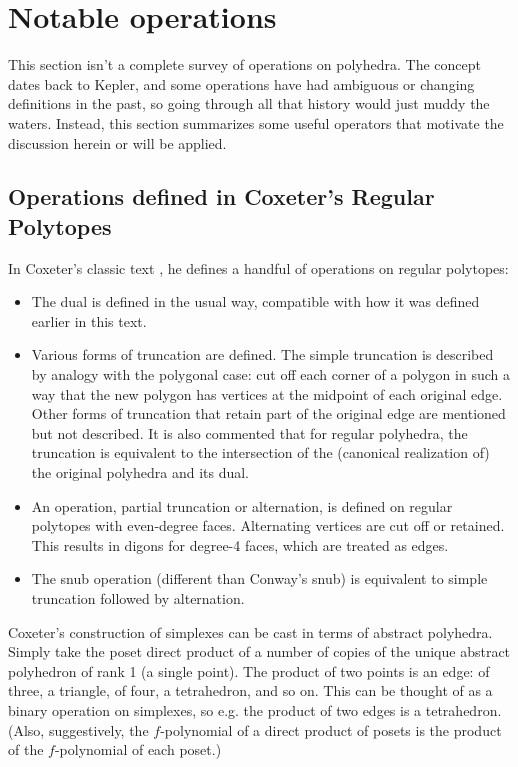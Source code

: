 \documentclass{amsart}[12pt]
\begin{document}
\section{Notable operations}

This section isn't a complete survey of operations on polyhedra. The concept
dates back to Kepler, and some operations have had ambiguous or changing
definitions in the past, so going through all that history would just muddy the
waters. Instead, this section summarizes some useful operators that motivate
the discussion herein or will be applied.

\subsection{Operations defined in Coxeter's Regular Polytopes}

In Coxeter's classic text \cite{Coxeter8},
he defines a handful of operations on regular polytopes:
\begin{itemize}
  \item The dual is defined in the usual way, compatible with how it was
  defined earlier in this text.
  \item Various forms of truncation are defined. The simple truncation is
  described by analogy with the polygonal case: cut off each corner of a
  polygon in such a way that the new polygon has vertices at the midpoint of
  each original edge. Other forms of truncation that retain part of the original
  edge are mentioned but not described. It is also commented that for regular
  polyhedra, the truncation is equivalent to the intersection
  of the (canonical realization of) the original polyhedra and its dual.
  \item An operation, partial truncation or alternation, is defined on regular
  polytopes with even-degree faces. Alternating vertices are cut off or
  retained. This results in digons for degree-4 faces,
  which are treated as edges.
  \item The snub operation (different than Conway's snub)
  is equivalent to simple truncation followed by alternation.
\end{itemize}

Coxeter's construction of simplexes can be cast in terms of abstract polyhedra.
Simply take the poset direct product of a number of copies of the unique
abstract polyhedron of rank 1 (a single point). The product of two points is an
edge: of three, a triangle, of four, a tetrahedron, and so on. This can be
thought of as a binary operation on simplexes, so e.g. the product of two edges
is a tetrahedron. (Also, suggestively, the $f$-polynomial of a direct product
of posets is the product of the $f$-polynomial of each poset.)
\end{document}
